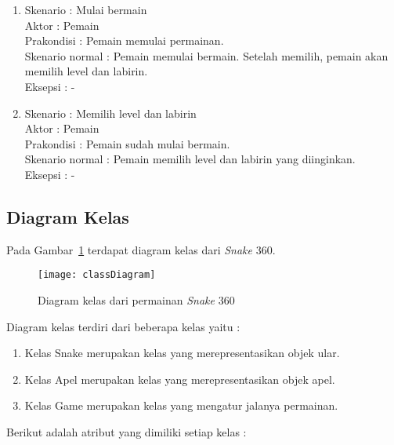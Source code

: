 \begin{enumerate}
	\item Skenario : Mulai bermain \\
Aktor : Pemain \\
Prakondisi : Pemain memulai permainan.\\
Skenario normal : Pemain memulai bermain. Setelah memilih, pemain akan memilih level dan labirin. \\
Eksepsi : - \\

	\item Skenario : Memilih level dan labirin \\
Aktor : Pemain \\
Prakondisi : Pemain sudah mulai bermain. \\
Skenario normal : Pemain memilih level dan labirin yang diinginkan. \\ 
Eksepsi : - \\
\end{enumerate}

\subsection{Diagram Kelas}
Pada Gambar~\ref{fig:classDiagram} terdapat diagram kelas dari \textit{Snake} 360.

\begin{figure}[H]
	\centering  
	\texttt{[image: classDiagram]}  
	\caption[Diagram class dari permainan \textit{Snake} 360]{Diagram kelas dari permainan \textit{Snake} 360}
	\label{fig:classDiagram} 
\end{figure}

Diagram kelas terdiri dari beberapa kelas yaitu :

\begin{enumerate}
	\item Kelas Snake merupakan  kelas yang merepresentasikan objek ular.
	\item Kelas Apel merupakan kelas yang merepresentasikan objek apel.
	\item Kelas Game merupakan kelas yang mengatur jalanya permainan.
\end{enumerate}

Berikut adalah atribut yang dimiliki setiap kelas :

